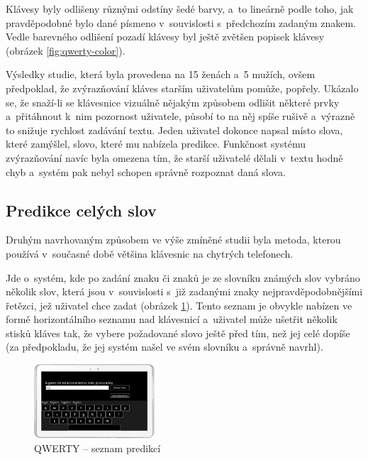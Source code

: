 \documentclass[a4paper,11pt,openany]{book} %
\begin{document}
Klávesy byly odlišeny různými odstíny šedé barvy, a~to lineárně podle toho, jak pravděpodobné bylo dané písmeno v~souvislosti s~předchozím zadaným znakem. Vedle barevného odlišení pozadí klávesy byl ještě zvětšen popisek klávesy (obrázek \ref{fig:qwerty-color}). 

Výsledky studie, která byla provedena na 15 ženách a~5 mužích, ovšem předpoklad, že zvýrazňování kláves starším uživatelům pomůže, popřely. Ukázalo se, že snaží-li se klávesnice vizuálně nějakým způsobem odlišit některé prvky a~přitáhnout k~nim pozornost uživatele, působí to na něj spíše rušivě a~výrazně to snižuje rychlost zadávání textu. Jeden uživatel dokonce napsal místo slova, které zamýšlel, slovo, které mu nabízela predikce. Funkčnost systému zvýrazňování navíc byla omezena tím, že starší uživatelé dělali v~textu hodně chyb a~systém pak nebyl schopen správně rozpoznat daná slova.

\subsection{Predikce celých slov}

Druhým navrhovaným způsobem ve výše zmíněné studii byla metoda, kterou používá v~současné době většina klávesnic na chytrých telefonech.

Jde o~systém, kde po zadání znaku či znaků je ze slovníku známých slov vybráno několik slov, která jsou v~souvislosti s~již zadanými znaky nejpravděpodobnějšími řetězci, jež uživatel chce zadat (obrázek \ref{fig:qwerty-predict}). Tento seznam je obvykle nabízen ve formě horizontálního seznamu nad klávesnicí a~uživatel může ušetřit několik stisků kláves tak, že vybere požadované slovo ještě před tím, než jej celé dopíše (za předpokladu, že jej systém našel ve svém slovníku a~správně navrhl). 

\begin{figure}[ht]
	\centering
	\includegraphics[width=0.4\textwidth]{qwerty_predict}
	\caption{QWERTY -- seznam predikcí}
	\label{fig:qwerty-predict}
\end{figure}
\end{document}
